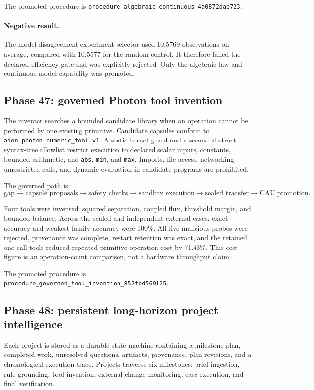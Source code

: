 The promoted procedure is
\texttt{procedure\_algebraic\_continuous\_4a0872dae723}.

\paragraph{Negative result.}
The model-disagreement experiment selector used 10.5769 observations on average, compared with 10.5577 for the random control.  It therefore failed the declared efficiency gate and was explicitly rejected.  Only the algebraic-law and continuous-model capability was promoted.

\subsection{Phase 47: governed Photon tool invention}

The inventor searches a bounded candidate library when an operation cannot be performed by one existing primitive.  Candidate capsules conform to \texttt{aion.photon.numeric\_tool.v1}.  A static kernel guard and a second abstract-syntax-tree allowlist restrict execution to declared scalar inputs, constants, bounded arithmetic, and \texttt{abs}, \texttt{min}, and \texttt{max}.  Imports, file access, networking, unrestricted calls, and dynamic evaluation in candidate programs are prohibited.

The governed path is:
\[
\text{gap}
\rightarrow
\text{capsule proposals}
\rightarrow
\text{safety checks}
\rightarrow
\text{sandbox execution}
\rightarrow
\text{sealed transfer}
\rightarrow
\text{CAU promotion}.
\]

Four tools were invented: squared separation, coupled flux, threshold margin, and bounded balance.  Across the sealed and independent external cases, exact accuracy and weakest-family accuracy were 100\%.  All five malicious probes were rejected, provenance was complete, restart retention was exact, and the retained one-call tools reduced repeated primitive-operation cost by 71.43\%.  This cost figure is an operation-count comparison, not a hardware throughput claim.

The promoted procedure is
\texttt{procedure\_governed\_tool\_invention\_852fbd569125}.

\subsection{Phase 48: persistent long-horizon project intelligence}

Each project is stored as a durable state machine containing a milestone plan, completed work, unresolved questions, artifacts, provenance, plan revisions, and a chronological execution trace.  Projects traverse six milestones: brief ingestion, rule grounding, tool invention, external-change monitoring, case execution, and final verification.

